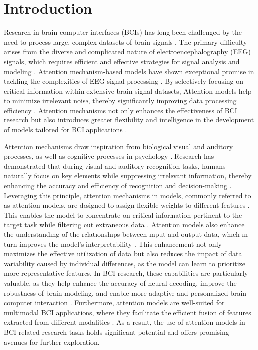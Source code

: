 \documentclass[preprint,12pt]{elsarticle}
\begin{document}
\section{Introduction}
\label{introduction}

Research in brain-computer interfaces (BCIs) has long been challenged by the need to process large, complex datasets of brain signals \cite{chen2017brain}. The primary difficulty arises from the diverse and complicated nature of electroencephalography (EEG) signals, which requires efficient and effective strategies for signal analysis and modeling \cite{subha2010eeg}. Attention mechanism-based models have shown exceptional promise in tackling the complexities of EEG signal processing \cite{abibullaev2023deep}. By selectively focusing on critical information within extensive brain signal datasets, Attention models help to minimize irrelevant noise, thereby significantly improving data processing efficiency \cite{de2022attention}. Attention mechanisms not only enhances the effectiveness of BCI research but also introduces greater flexibility and intelligence in the development of models tailored for BCI applications \cite{keutayeva2023exploring}.

Attention mechanisms draw inspiration from biological visual and auditory processes, as well as cognitive processes in psychology \cite{fukui2019attention}. Research has demonstrated that during visual and auditory recognition tasks, humans naturally focus on key elements while suppressing irrelevant information, thereby enhancing the accuracy and efficiency of recognition and decision-making \cite{soydaner2022attention}. Leveraging this principle, attention mechanisms in models, commonly referred to as attention models, are designed to assign flexible weights to different features \cite{lv2022attention}. This enables the model to concentrate on critical information pertinent to the target task while filtering out extraneous data \cite{niu2021review}. Attention models also enhance the understanding of the relationships between input and output data, which in turn improves the model's interpretability \cite{gao2021interpretable}. This enhancement not only maximizes the effective utilization of data but also reduces the impact of data variability caused by individual differences, as the model can learn to prioritize more representative features. In BCI research, these capabilities are particularly valuable, as they help enhance the accuracy of neural decoding, improve the robustness of brain modeling, and enable more adaptive and personalized brain-computer interaction \cite{wang2023mtrt}. Furthermore, attention models are well-suited for multimodal BCI applications, where they facilitate the efficient fusion of features extracted from different modalities \cite{DUAN2024102536}. As a result, the use of attention models in BCI-related research tasks holds significant potential and offers promising avenues for further exploration.
\end{document}
